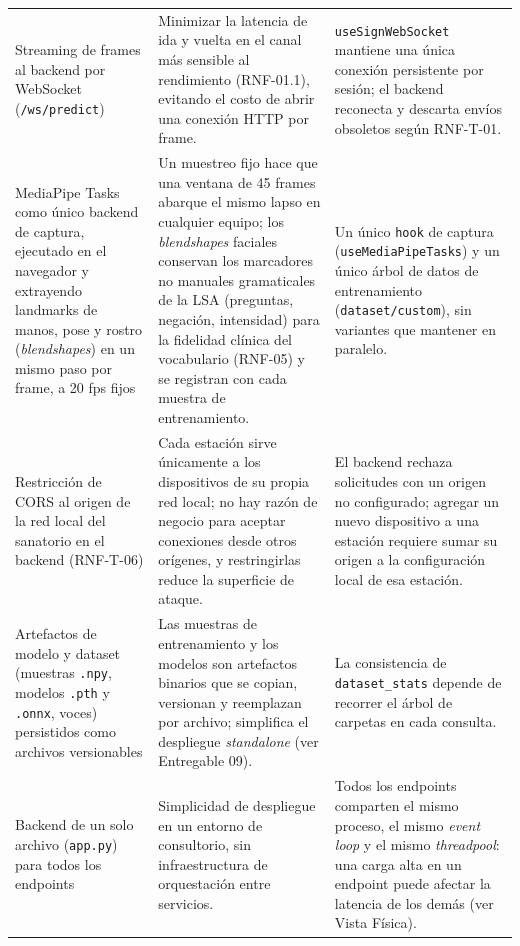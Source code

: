 \begin{longtable}{>{\raggedright\arraybackslash}p{4.25cm} >{\raggedright\arraybackslash}p{5.2cm} >{\raggedright\arraybackslash}p{5.2cm}}
    Streaming de frames al backend por WebSocket (\texttt{/ws/predict}) &
    Minimizar la latencia de ida y vuelta en el canal más sensible al
    rendimiento (RNF-01.1), evitando el costo de abrir una conexión HTTP por
    frame. &
    \texttt{useSignWebSocket} mantiene una única conexión persistente por
    sesión; el backend reconecta y descarta envíos obsoletos según
    RNF-T-01. \\

    MediaPipe Tasks como único backend de captura, ejecutado en el
    navegador y extrayendo landmarks de manos, pose y rostro
    (\textit{blendshapes}) en un mismo paso por frame, a 20 fps fijos &
    Un muestreo fijo hace que una ventana de 45 frames abarque el mismo
    lapso en cualquier equipo; los \textit{blendshapes} faciales conservan
    los marcadores no manuales gramaticales de la LSA (preguntas, negación,
    intensidad) para la fidelidad clínica del vocabulario (RNF-05) y se
    registran con cada muestra de entrenamiento. &
    Un único \texttt{hook} de captura (\texttt{useMediaPipeTasks}) y un
    único árbol de datos de entrenamiento (\texttt{dataset/custom}), sin
    variantes que mantener en paralelo. \\

    Restricción de CORS al origen de la red local del sanatorio en el
    backend (RNF-T-06) &
    Cada estación sirve únicamente a los dispositivos de su propia red
    local; no hay razón de negocio para aceptar conexiones desde otros
    orígenes, y restringirlas reduce la superficie de ataque. &
    El backend rechaza solicitudes con un origen no configurado; agregar un
    nuevo dispositivo a una estación requiere sumar su origen a la
    configuración local de esa estación. \\

    Artefactos de modelo y dataset (muestras \texttt{.npy}, modelos
    \texttt{.pth} y \texttt{.onnx}, voces) persistidos como archivos
    versionables &
    Las muestras de entrenamiento y los modelos son artefactos binarios
    que se copian, versionan y reemplazan por archivo; simplifica el
    despliegue \textit{standalone} (ver Entregable 09). &
    La consistencia de \texttt{dataset\_stats} depende de recorrer el árbol
    de carpetas en cada consulta. \\

    Backend de un solo archivo (\texttt{app.py}) para todos los endpoints &
    Simplicidad de despliegue en un entorno de consultorio, sin
    infraestructura de orquestación entre servicios. &
    Todos los endpoints comparten el mismo proceso, el mismo \textit{event
    loop} y el mismo \textit{threadpool}: una carga alta en un endpoint
    puede afectar la latencia de los demás (ver Vista Física). \\


\end{longtable}
